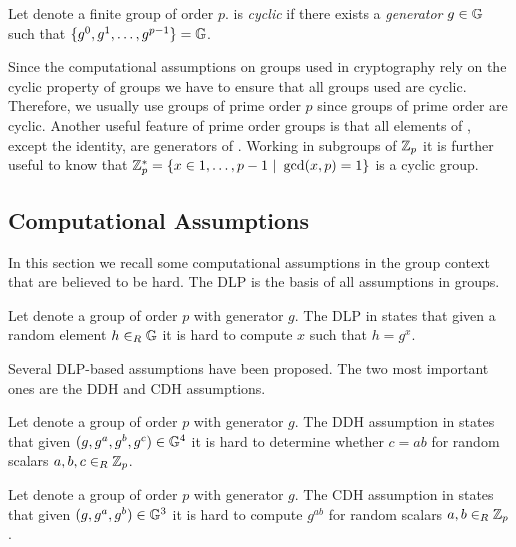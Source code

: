 \begin{definition}\label{def:cyclicgroups}
Let \GG denote a finite group of order $p$.
\GG is \emph{cyclic} if there exists a \emph{generator} $g\in\mathbb{G}$ such that $\{g^0,g^1,\dots,g^{p-1}\}=\mathbb{G}$.
\eod
\end{definition}

\noindent
Since the computational assumptions on groups used in cryptography rely on the cyclic property of groups we have to ensure that all groups used are cyclic.
Therefore, we usually use groups of prime order $p$ since groups of prime order are cyclic.
Another useful feature of prime order groups is that all elements of \GG, except the identity, are generators of \GG.
Working in subgroups of $\mathbb{Z}_p$ it is further useful to know that $\mathbb{Z}^\ast_p=\{x\in{1,\dots,p-1}~|~\gcd(x,p)=1\}$ is a cyclic group.

\subsection{Computational Assumptions}
In this section we recall some computational assumptions in the group context that are believed to be hard.
The \ac{DLP} is the basis of all assumptions in groups.

\begin{definition}\label{def:dlp}
Let \GG denote a group of order $p$ with generator $g$.
The \ac{DLP} in \GG states that given a random element $h\in_R\mathbb{G}$ it is hard to compute $x$ such that $h=g^x$.
\eod
\end{definition}

\noindent
Several \ac{DLP}-based assumptions have been proposed.
The two most important ones are the \ac{DDH} and \ac{CDH} assumptions.

\begin{definition}\label{def:ddh}
Let \GG denote a group of order $p$ with generator $g$.
The \ac{DDH} assumption in \GG states that given $(g,g^a,g^b,g^c)\in\mathbb{G}^4$ it is hard to determine whether $c=ab$ for random scalars $a,b,c\in_R\mathbb{Z}_p$.
\eod
\end{definition}

\begin{definition}\label{def:cdh}
Let \GG denote a group of order $p$ with generator $g$.
The \ac{CDH} assumption in \GG states that given $(g,g^a,g^b)\in\mathbb{G}^3$ it is hard to compute $g^{ab}$ for random scalars $a,b\in_R\mathbb{Z}_p$.
\eod
\end{definition}

